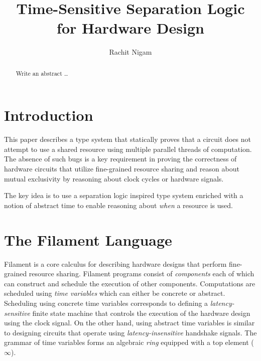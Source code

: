 \documentclass[acmsmall,review,anonymous]{acmart}
\begin{document}
\title{Time-Sensitive Separation Logic for Hardware Design}


\author{Rachit Nigam}

\begin{abstract}
Write an abstract \ldots
\end{abstract}

\maketitle

\section{Introduction}

This paper describes a type system that statically proves that a circuit does not attempt to use a shared resource using multiple parallel threads of computation.
The absence of such bugs is a key requirement in proving the correctness of hardware circuits that utilize fine-grained resource sharing and reason about mutual exclusivity by reasoning about clock cycles or hardware signals.

The key idea is to use a separation logic inspired type system enriched with a notion of abstract time to enable reasoning about \emph{when} a resource is used.

\section{The Filament Language}

Filament is a core calculus for describing hardware designs that perform fine-grained resource sharing.
Filament programs consist of \emph{components} each of which can construct and schedule the execution of other components.
Computations are scheduled using \emph{time variables} which can either be concrete or abstract.
%
%
Scheduling using concrete time variables corresponds to defining a \emph{latency-sensitive} finite state machine that controls the execution of the hardware design using the clock signal.
On the other hand, using abstract time variables is similar to designing circuits that operate using \emph{latency-insensitive} handshake signals.
The grammar of time variables forms an algebraic \emph{ring} equipped with a top element ($\infty$).
\end{document}
